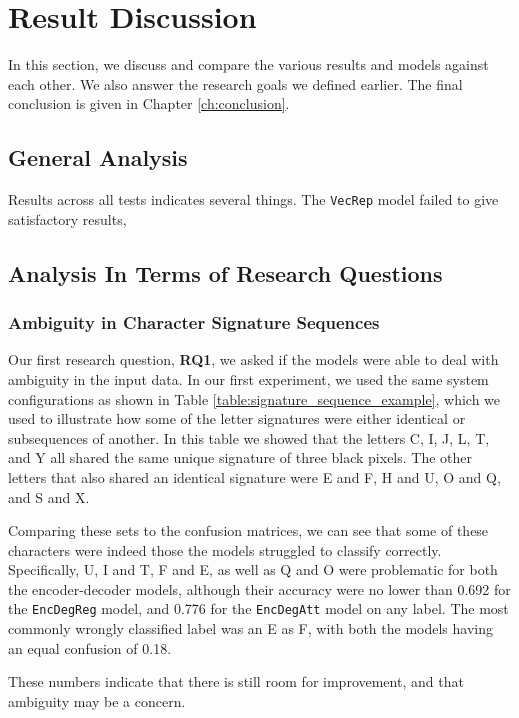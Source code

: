 \section{Result Discussion}
In this section, we discuss and compare the various results and models against each other. We also answer the research goals we defined earlier. The final conclusion is given in Chapter \ref{ch:conclusion}.

\subsection{General Analysis}


Results across all tests indicates several things. The {\tt VecRep} model failed to give satisfactory results, 

\subsection{Analysis In Terms of Research Questions}

\subsubsection{Ambiguity in Character Signature Sequences}
Our first research question, \textbf{RQ1}, we asked if the models were able to deal with ambiguity in the input data. In our first experiment, we used the same system configurations as shown in Table \ref{table:signature_sequence_example}, which we used to illustrate how some of the letter signatures were either identical or subsequences of another. In this table we showed that the letters C, I, J, L, T, and Y all shared the same unique signature of three black pixels. The other letters that also shared an identical signature were E and F, H and U, O and Q, and S and X. 

Comparing these sets to the confusion matrices, we can see that some of these characters were indeed those the models struggled to classify correctly. Specifically, U, I and T, F and E, as well as Q and O were problematic for both the encoder-decoder models, although their accuracy were no lower than 0.692 for the {\tt EncDegReg} model, and 0.776 for the {\tt EncDegAtt} model on any label. The most commonly wrongly classified label was an E as F, with both the models having an equal confusion of 0.18. 

These numbers indicate that there is still room for improvement, and that ambiguity may be a concern.

